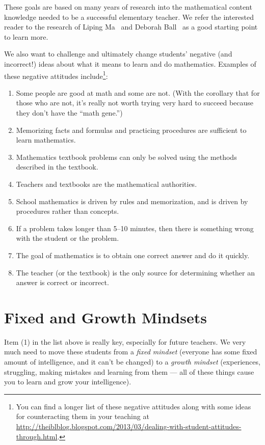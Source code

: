\documentclass[12pt, reqno]{amsart}
\theoremstyle{remark}
\theoremstyle{definition}
\numberwithin{equation}{section}  %
\begin{document}
These goals are based on many years of research into the mathematical content knowledge needed to be a successful elementary teacher.  We refer the interested reader to the research of Liping Ma~\cite{Ma} and Deborah Ball~\cite{ball1, ball2, ball3} as a good starting point to learn more.

We also want to challenge and ultimately change students' negative (and incorrect!) ideas about what it means to learn and do mathematics.  Examples of these negative attitudes include\footnote{You can find a longer list of these negative attitudes along with some ideas for counteracting them in your teaching at  \url{http://theiblblog.blogspot.com/2013/03/dealing-with-student-attitudes-through.html}.}:
\begin{enumerate}
\item
Some people are good at math and some are not.  (With the corollary that for those who are not, it's really not worth trying very hard to succeed because they don't have the ``math gene.'')
\item
Memorizing facts and formulas and practicing procedures are sufficient to learn mathematics.
\item
Mathematics textbook problems can only be solved using the methods described in the textbook.
\item
Teachers and textbooks are the mathematical authorities.
\item
School mathematics is driven by rules and memorization, and is driven by procedures rather than concepts.
\item
If a problem takes longer than 5--10 minutes, then there is something wrong with the student or the problem.
\item
The goal of mathematics is to obtain one correct answer and do it quickly.
\item
The teacher (or the textbook) is the only source for determining whether an answer is correct or incorrect.
\end{enumerate}

\section{Fixed and Growth Mindsets}
Item (1) in the list above is really key, especially for future teachers.  We very much need to move these students from a \emph{fixed mindset} (everyone has some fixed amount of intelligence, and it can't be changed) to a \emph{growth mindset} (experiences, struggling, making mistakes and learning from them --- all of these things cause you to learn and grow your intelligence).
\end{document}
